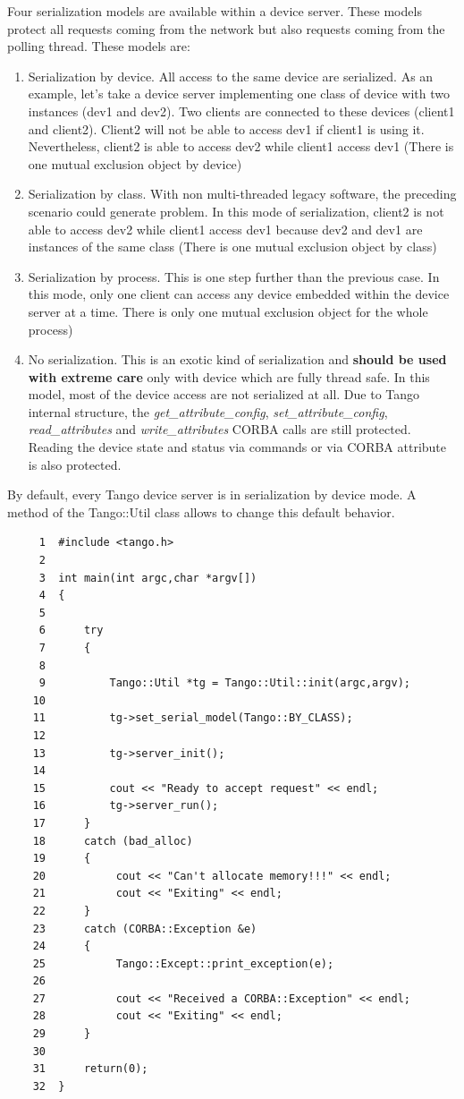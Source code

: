 Four serialization models are available within
a device server. These models protect all requests coming from the
network but also requests coming from the polling thread. These models
are:
\begin{enumerate}
\item Serialization by device. All access to the same device are serialized.
As an example, let's take a device server implementing one class of
device with two instances (dev1 and dev2). Two clients are connected
to these devices (client1 and client2). Client2 will not be able to
access dev1 if client1 is using it. Nevertheless, client2 is able
to access dev2 while client1 access dev1 (There is one mutual exclusion
object by device)
\item Serialization by class. With non multi-threaded legacy software, the
preceding scenario could generate problem. In this mode of serialization,
client2 is not able to access dev2 while client1 access dev1 because
dev2 and dev1 are instances of the same class (There is one mutual
exclusion object by class)
\item Serialization by process. This is one step further than the previous
case. In this mode, only one client can access any device embedded
within the device server at a time. There is only one mutual exclusion
object for the whole process)
\item No serialization. This is an exotic kind of serialization and \textbf{should
be used with extreme care} only with device which are fully thread
safe. In this model, most of the device access are not serialized
at all. Due to Tango internal structure, the \emph{get\_attribute\_config},
\emph{set\_attribute\_config}, \emph{read\_attributes} and \emph{write\_attributes}
CORBA calls are still protected. Reading the device state and status
via commands or via CORBA attribute is also protected.
\end{enumerate}
By default, every Tango device server is in serialization by device
mode. A method of the Tango::Util class allows to change this default
behavior.\newpage{}


\begin{verbatim}
     1  #include <tango.h>
     2  
     3  int main(int argc,char *argv[])
     4  {
     5  
     6      try
     7      {
     8          
     9          Tango::Util *tg = Tango::Util::init(argc,argv);
    10  
    11          tg->set_serial_model(Tango::BY_CLASS);
    12  
    13          tg->server_init();
    14  
    15          cout << "Ready to accept request" << endl;
    16          tg->server_run();
    17      }
    18      catch (bad_alloc)
    19      {
    20           cout << "Can't allocate memory!!!" << endl;
    21           cout << "Exiting" << endl;
    22      }
    23      catch (CORBA::Exception &e)
    24      {
    25           Tango::Except::print_exception(e);
    26                  
    27           cout << "Received a CORBA::Exception" << endl;
    28           cout << "Exiting" << endl;
    29      }
    30          
    31      return(0);
    32  }

\end{verbatim}


